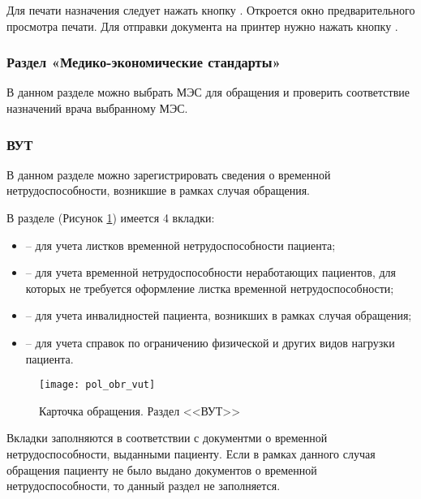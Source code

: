 Для печати назначения следует нажать кнопку . Откроется окно предварительного просмотра печати. Для отправки документа на принтер нужно нажать кнопку .

\subsubsection{Раздел «Медико-экономические стандарты»}

В данном разделе можно выбрать МЭС для обращения и проверить соответствие назначений врача выбранному МЭС.

\subsubsection{ВУТ} \label{pol_vut}

В данном разделе можно зарегистрировать сведения о временной нетрудоспособности, возникшие в рамках случая обращения.

В разделе (Рисунок \ref{img_pol_obr_vut}) имеется 4 вкладки:
\begin{itemize}
 \item {} -- для учета листков временной нетрудоспособности пациента;
 \item {} -- для учета временной нетрудоспособности неработающих пациентов, для которых не требуется оформление листка временной нетрудоспособности;
 \item {} -- для учета инвалидностей пациента, возникших в рамках случая обращения;
 \item {} -- для учета справок по ограничению физической и других видов нагрузки пациента.
\end{itemize}

 \begin{figure}[ht]\centering
   \texttt{[image: pol\_obr\_vut]}
   \caption{Карточка обращения. Раздел <<ВУТ>>}
   \label{img_pol_obr_vut}
 \end{figure}
 
Вкладки заполняются в соответствии с документми о временной нетрудоспособности, выданными пациенту. Если в рамках данного случая обращения пациенту не было выдано документов о временной нетрудоспособности, то данный раздел не заполняется.

